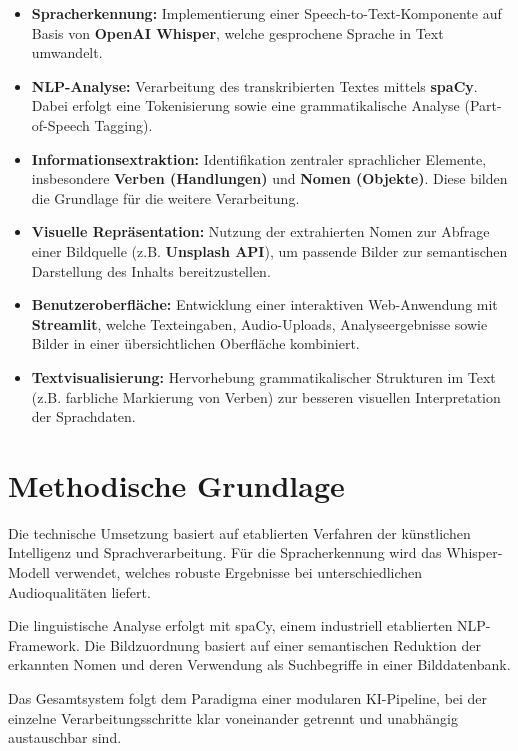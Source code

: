 \begin{itemize}
    \item \textbf{Spracherkennung:} Implementierung einer Speech-to-Text-Komponente auf Basis von \textbf{OpenAI Whisper}, welche gesprochene Sprache in Text umwandelt.

    \item \textbf{NLP-Analyse:} Verarbeitung des transkribierten Textes mittels \textbf{spaCy}. Dabei erfolgt eine Tokenisierung sowie eine grammatikalische Analyse (Part-of-Speech Tagging).

    \item \textbf{Informationsextraktion:} Identifikation zentraler sprachlicher Elemente, insbesondere \textbf{Verben (Handlungen)} und \textbf{Nomen (Objekte)}. Diese bilden die Grundlage für die weitere Verarbeitung.

    \item \textbf{Visuelle Repräsentation:} Nutzung der extrahierten Nomen zur Abfrage einer Bildquelle (z.B. \textbf{Unsplash API}), um passende Bilder zur semantischen Darstellung des Inhalts bereitzustellen.

    \item \textbf{Benutzeroberfläche:} Entwicklung einer interaktiven Web-Anwendung mit \textbf{Streamlit}, welche Texteingaben, Audio-Uploads, Analyseergebnisse sowie Bilder in einer übersichtlichen Oberfläche kombiniert.

    \item \textbf{Textvisualisierung:} Hervorhebung grammatikalischer Strukturen im Text (z.B. farbliche Markierung von Verben) zur besseren visuellen Interpretation der Sprachdaten.
\end{itemize}

\section{Methodische Grundlage}
Die technische Umsetzung basiert auf etablierten Verfahren der künstlichen Intelligenz und Sprachverarbeitung. Für die Spracherkennung wird das Whisper-Modell verwendet, welches robuste Ergebnisse bei unterschiedlichen Audioqualitäten liefert.

Die linguistische Analyse erfolgt mit spaCy, einem industriell etablierten NLP-Framework. Die Bildzuordnung basiert auf einer semantischen Reduktion der erkannten Nomen und deren Verwendung als Suchbegriffe in einer Bilddatenbank.

Das Gesamtsystem folgt dem Paradigma einer modularen KI-Pipeline, bei der einzelne Verarbeitungsschritte klar voneinander getrennt und unabhängig austauschbar sind.
